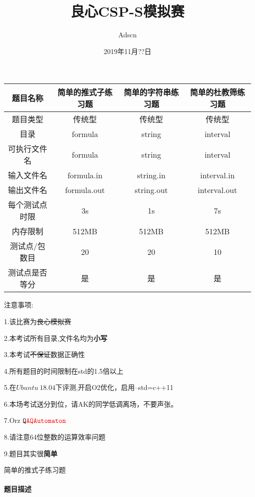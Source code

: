 \documentclass[UTF8]{ctexart}
\begin{document}
\title{良心CSP-S模拟赛}
\author{Adscn}
\date{2019年11月??日}
\maketitle

\begin{table}[!htbp]
	\centering
	\begin{tabular}{|c|c|c|c|}
		\hline
		题目名称&简单的推式子练习题&简单的字符串练习题&简单的杜教筛练习题\\
		\hline
        题目类型&传统型&传统型&传统型\\
        \hline
        目录&formula&string&interval\\
        \hline
        可执行文件名&formula&string&interval\\
        \hline
        输入文件名&formula.in&string.in&interval.in\\
        \hline
        输出文件名&formula.out&string.out&interval.out\\
        \hline
        每个测试点时限&3s&1s&7s\\
        \hline
        内存限制&512MB&512MB&512MB\\
        \hline
        测试点/包数目&20&20&10\\
        \hline
        测试点是否等分&是&是&是\\
		\hline
    \end{tabular}
\end{table}

注意事项:

1.该比赛为\sout{良心模拟赛}

2.本考试所有目录,文件名均为\textbf{小写}

3.本考试\sout{不保证}数据正确性

4.所有题目的时间限制在std的1.5倍以上

5.在$Ubuntu\ 18.04$下评测,开启O2优化，启用--std=c++11

6.本场考试送分到位，请AK的同学低调离场，不要声张。

7.Orz $\color{black}\texttt{Q}\color{red}\texttt{AQAutomaton}$

8.请注意64位整数的运算效率问题

9.题目其实很\textbf{简单}

\clearpage

\begin{center}
    \large{简单的推式子练习题}
\end{center}
\paragraph{题目描述}
\end{document}
